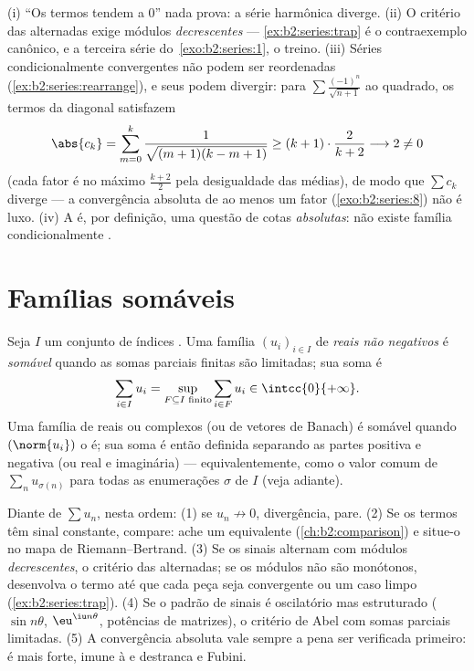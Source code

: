 \begin{remark}\label{rem:b2:series:pitfalls}
(i) ``Os termos tendem a $0$'' nada prova: a série harmônica
diverge. (ii) O critério das alternadas exige módulos
\emph{decrescentes} --- \cref{ex:b2:series:trap} é o
contraexemplo canônico, e a terceira série do~\cref{exo:b2:series:1}, o
treino. (iii) Séries condicionalmente convergentes não podem ser
reordenadas (\cref{ex:b2:series:rearrange}), e seus  podem divergir: para $\sum\frac{(-1)^n}{\sqrt{n+1}}$
ao quadrado, os termos da diagonal satisfazem
\[
\abs{c_k} = \sum_{m=0}^{k}
\frac{1}{\sqrt{(m+1)(k-m+1)}}
\geq (k+1)\cdot\frac{2}{k+2} \longrightarrow 2 \neq 0
\]
(cada fator é no máximo $\frac{k+2}2$ pela desigualdade das médias), de modo que $\sum c_k$
diverge --- a convergência absoluta de ao menos um fator
(\cref{exo:b2:series:8}) não é luxo. (iv) A  é,
por definição, uma questão de cotas \emph{absolutas}: não existe
família condicionalmente .
\end{remark}

\section{Famílias somáveis}

\begin{definition}\label{def:b2:series:summable}
Seja $I$ um conjunto de índices . Uma família $(u_i)_{i \in I}$ de
\emph{reais não negativos} é \emph{somável}
quando as somas parciais finitas são limitadas; sua soma é
\[
\sum_{i \in I} u_i = \sup_{F \subseteq I \text{ finito}} \sum_{i
\in F} u_i \in \intcc{0}{+\infty} .
\]
Uma família de reais ou complexos (ou de vetores de Banach) é somável quando
$(\norm{u_i})$ o é; sua soma é então definida separando as partes
positiva e negativa (ou real e imaginária) --- equivalentemente, como o
valor comum de $\sum_{n} u_{\sigma(n)}$ para todas as enumerações
$\sigma$ de $I$ (veja adiante).
\end{definition}

\begin{method}\label{met:b2:series:choosing}
Diante de $\sum u_n$, nesta ordem: (1) se $u_n \not\to 0$, divergência,
pare. (2) Se os termos têm sinal constante, compare: ache um
equivalente (\cref{ch:b2:comparison}) e situe-o no
mapa de Riemann--Bertrand. (3) Se os sinais alternam com
módulos \emph{decrescentes}, o critério das alternadas; se os módulos
não são monótonos, desenvolva o termo até que cada peça seja 
convergente ou um caso limpo (\cref{ex:b2:series:trap}). (4)
Se o padrão de sinais é oscilatório mas estruturado ($\sin
n\theta$, $\eu^{\iu n\theta}$, potências de matrizes), o critério de Abel com
somas parciais limitadas. (5) A convergência absoluta vale sempre
a pena ser verificada primeiro: é mais forte, imune à  e destranca  e Fubini.
\end{method}

